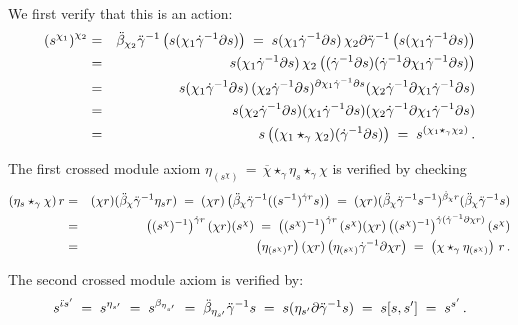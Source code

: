 \begin{pf}
We first verify that this is an action:
\begin{eqnarray*} 
\left( s^{\chi_1} \right)^{\chi_2} 
  & = &  \ddot{\beta}_{\chi_2} \ddot{\gamma}^{-1} \left( s(\chi_1\dot{\gamma}^{-1}\partial s) \right) 
  \;=\;  s(\chi_1\dot{\gamma}^{-1}\partial s)\, 
         \chi_2\partial\ddot{\gamma}^{-1} \left( s(\chi_1\dot{\gamma}^{-1}\partial s) \right) \\ 
  & = &  s(\chi_1\dot{\gamma}^{-1}\partial s)\, 
         \chi_2\left( (\dot{\gamma}^{-1}\partial s)
                      (\dot{\gamma}^{-1}\partial\chi_1\dot{\gamma}^{-1}\partial s) \right) \\  
  & = &  s(\chi_1\dot{\gamma}^{-1}\partial s)\, 
         (\chi_2\dot{\gamma}^{-1}\partial s)^{\partial\chi_1\dot{\gamma}^{-1}\partial s} 
             (\chi_2\dot{\gamma}^{-1}\partial\chi_1\dot{\gamma}^{-1}\partial s)  \\
  & = &  s(\chi_2\dot{\gamma}^{-1}\partial s)(\chi_1\dot{\gamma}^{-1}\partial s)
             (\chi_2\dot{\gamma}^{-1}\partial\chi_1\dot{\gamma}^{-1}\partial s)  \\
  & = &  s \left( (\chi_1 \star_{\gamma} \chi_2)(\dot{\gamma}^{-1}\partial s) \right) 
  \;=\;  s^{(\chi_1 \star_{\gamma} \chi_2)} \,.
\end{eqnarray*} 

\noindent
The first crossed module axiom 
$\eta_{(s^{\chi})} \,=\, 
 \overline{\chi} \star_{\gamma} \eta_s \star_{\gamma} \chi$
is verified by checking 
\begin{eqnarray*} 
(\eta_s \star_{\gamma} \chi)\,r
  & = &  (\chi r)(\ddot{\beta}_{\chi} \ddot{\gamma}^{-1} \eta_s r) 
  \;=\;  (\chi r)\left(\ddot{\beta}_{\chi}\ddot{\gamma}^{-1}((s^{-1})^{\dot{\gamma} r}s)\right)  
  \;=\;  (\chi r)(\ddot{\beta}_{\chi}\ddot{\gamma}^{-1}s^{-1})^{\dot{\beta}_{\chi}r} 
           (\ddot{\beta}_{\chi}\ddot{\gamma}^{-1}s) \\
  & = &  \left((s^{\chi})^{-1}\right)^{\dot{\gamma} r}(\chi r)(s^{\chi}) 
  \;=\;  \left((s^{\chi})^{-1}\right)^{\dot{\gamma} r}
            (s^{\chi})(\chi r)
            \left((s^{\chi})^{-1}\right)^{\dot{\gamma}(\dot{\gamma}^{-1}\partial\chi r)} 
            (s^{\chi}) \\  
  & = &  \left(\eta_{(s^{\chi})}r\right)(\chi r)
           \left(\eta_{(s^{\chi})}\dot{\gamma}^{-1}\partial\chi r\right) 
  \;=\;  \left(\chi \star_{\gamma} \eta_{(s^{\chi})}\right)\,r\,.
\end{eqnarray*}

\noindent
The second crossed module axiom is verified by:
$$ 
s^{\ddot{\iota} s^{\prime}} 
  \;=\; s^{\eta_{s'}} 
  \;=\; s^{\beta_{\eta_{s'}}} 
  \;=\; \ddot{\beta}_{\eta_{s'}} \ddot{\gamma}^{-1} s 
  \;=\; s(\eta_{s'} \partial \ddot{\gamma}^{-1} s) 
  \;=\; s[s,s'] 
  \;=\; s^{s'}\,. 
$$ 
\end{pf}

